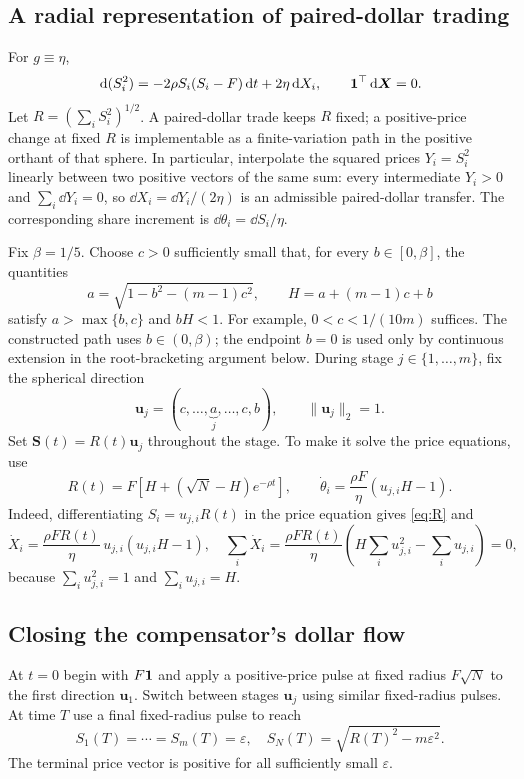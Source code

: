 \documentclass[review,hidelinks,onefignum,onetabnum]{siamonline250211}
\begin{document}
\subsection{A radial representation of paired-dollar trading}
For $g\equiv\eta$,
\begin{equation}\label{eq:radius-appendix}
\,\mathrm{d}(S_i^2)= -2\rho S_i(S_i-F)\,\mathrm{d} t+2\eta\,\mathrm{d} X_i,
\qquad \mathbf{1}^\top\,\mathrm{d}\bm X=0.
\end{equation}
Let $R=(\sum_iS_i^2)^{1/2}$. A paired-dollar trade keeps $R$ fixed; a positive-price change at fixed $R$ is implementable as a finite-variation path in the positive orthant of that sphere. In particular, interpolate the squared prices $Y_i=S_i^2$ linearly between two positive vectors of the same sum: every intermediate $Y_i>0$ and $\sum_i\dd Y_i=0$, so $\dd X_i=\dd Y_i/(2\eta)$ is an admissible paired-dollar transfer. The corresponding share increment is $\dd\theta_i=\dd S_i/\eta$.

Fix $\beta=1/5$. Choose $c>0$ sufficiently small that, for every $b\in[0,\beta]$, the quantities
\begin{equation}\label{eq:abcs}
a=\sqrt{1-b^2-(m-1)c^2},\qquad H=a+(m-1)c+b
\end{equation}
satisfy $a>\max\{b,c\}$ and $bH<1$. For example, $0<c<1/(10m)$ suffices. The constructed path uses $b\in(0,\beta)$; the endpoint $b=0$ is used only by continuous extension in the root-bracketing argument below. During stage $j\in\{1,\dots,m\}$, fix the spherical direction
\begin{equation}\label{eq:uj}
\bm u_j=(c,\ldots,\underbrace{a}_{j},\ldots,c,b),
\qquad \|\bm u_j\|_2=1.
\end{equation}
Set $\bm S(t)=R(t)\bm u_j$ throughout the stage. To make it solve the price equations, use
\begin{equation}\label{eq:R}
R(t)=F\left[H+(\sqrt N-H)e^{-\rho t}\right],
\qquad
\dot\theta_i=\frac{\rho F}{\eta}\left(u_{j,i}H-1\right).
\end{equation}
Indeed, differentiating $S_i=u_{j,i}R(t)$ in the price equation gives \eqref{eq:R} and
\begin{equation}\label{eq:dXdt}
\dot X_i=\frac{\rho FR(t)}\eta\,u_{j,i}(u_{j,i}H-1),
\quad \sum_i\dot X_i=\frac{\rho FR(t)}\eta\left(H\sum_i u_{j,i}^2-\sum_i u_{j,i}\right)=0,
\end{equation}
because $\sum_i u_{j,i}^2=1$ and $\sum_i u_{j,i}=H$.

\subsection{Closing the compensator's dollar flow}
At $t=0$ begin with $F\mathbf{1}$ and apply a positive-price pulse at fixed radius $F\sqrt N$ to the first direction $\bm u_1$. Switch between stages $\bm u_j$ using similar fixed-radius pulses. At time $T$ use a final fixed-radius pulse to reach
\begin{equation}\label{eq:endpoint-severe}
S_1(T)=\cdots=S_m(T)=\varepsilon,
\quad S_N(T)=\sqrt{R(T)^2-m\varepsilon^2}.
\end{equation}
The terminal price vector is positive for all sufficiently small $\varepsilon$.
\end{document}
